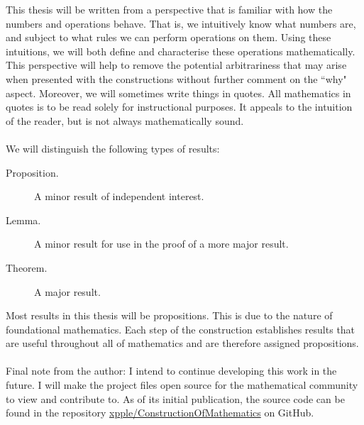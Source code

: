 \documentclass[../main.tex]{subfiles}
\begin{document}
This thesis will be written from a perspective that is familiar with how the numbers and operations behave. That is, we intuitively know what numbers are, and subject to what rules we can perform operations on them. Using these intuitions, we will both define and characterise these operations mathematically. This perspective will help to remove the potential arbitrariness that may arise when presented with the constructions without further comment on the ``why" aspect. Moreover, we will sometimes write things in quotes. All mathematics in quotes is to be read solely for instructional purposes. It appeals to the intuition of the reader, but is not always mathematically sound. \\\\
We will distinguish the following types of results:
\begin{description}
    \item[Proposition.] A minor result of independent interest.
    \item[Lemma.] A minor result for use in the proof of a more major result.
    \item[Theorem.] A major result.
\end{description}
Most results in this thesis will be propositions. This is due to the nature of foundational mathematics. Each step of the construction establishes results that are useful throughout all of mathematics and are therefore assigned propositions. \\\\
Final note from the author: I intend to continue developing this work in the future. I will make the project files open source for the mathematical community to view and contribute to. As of its initial publication, the source code can be found in the repository \href{https://github.com/xpple/ConstructionOfMathematics}{xpple/ConstructionOfMathematics} on GitHub.
\end{document}
